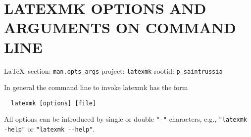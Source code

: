  
 

\clearpage
\section{LATEXMK OPTIONS AND ARGUMENTS ON COMMAND LINE}
  
\vspace{0.5cm}
 {\ifDEBUG\small\LaTeX~section: \verb|man.opts_args| project: \verb|latexmk| rootid: \verb|p_saintrussia| \fi}
\vspace{0.5cm}

In general the command line to invoke latexmk has the form

\begin{verbatim}
  latexmk [options] [file]
\end{verbatim}

All options can be introduced by single or double \verb|"-"| characters, e.g.,
\verb|"latexmk -help"| or \verb|"latexmk --help"|.


